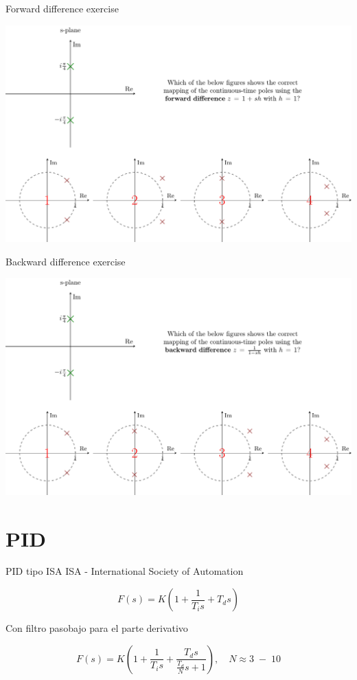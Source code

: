 \documentclass[presentation,aspectratio=1610]{beamer}
\begin{document}
\begin{frame}[label={sec:org25e0bd6}]{Forward difference exercise}
\begin{center}
\includegraphics[width=\linewidth]{../../figures/forward-diff-exercise}
\end{center}
\end{frame}
\begin{frame}[label={sec:org7826ce9}]{Backward difference exercise}
\begin{center}
\includegraphics[width=\linewidth]{../../figures/backward-diff-exercise}
\end{center}
\end{frame}


\section{PID}
\label{sec:orgaa0cd57}
\begin{frame}[label={sec:orgfb68a74}]{PID tipo ISA}
ISA - International Society of Automation

\[ F(s) = K\left( 1 + \frac{1}{T_i s} + T_d s\right) \]

Con filtro pasobajo para el parte derivativo

\[ F(s) = K\left( 1 + \frac{1}{T_i s} + \frac{T_d s}{\frac{T_d}{N} s + 1}\right), \quad N \approx 3\; - \; 10 \]
\end{frame}
\end{document}
